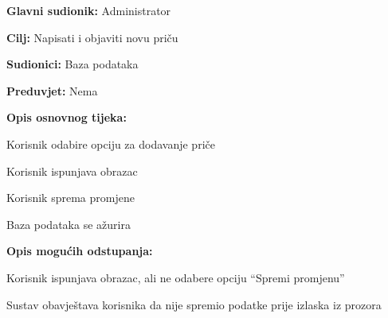 					\noindent {}
					\begin{packed_item}
						
						\item \textbf{Glavni sudionik: }Administrator
						\item  \textbf{Cilj:} Napisati i objaviti novu priču
						\item  \textbf{Sudionici:} Baza podataka
						\item  \textbf{Preduvjet:} Nema
						\item  \textbf{Opis osnovnog tijeka:}
						
						\item[] \begin{packed_enum}
							\item Korisnik odabire opciju za dodavanje priče
							\item Korisnik ispunjava obrazac
							\item Korisnik sprema promjene
							\item Baza podataka se ažurira
						\end{packed_enum}
					
						\item  \textbf{Opis mogućih odstupanja:}
						
						\item[] \begin{packed_item}
							
							\item[2.a] Korisnik ispunjava obrazac, ali ne odabere opciju “Spremi promjenu”
							\item[] \begin{packed_enum}
								
								\item Sustav obavještava korisnika da nije spremio podatke prije izlaska iz prozora
								
							\end{packed_enum}
							
						\end{packed_item}
				
						
					\end{packed_item}
				
